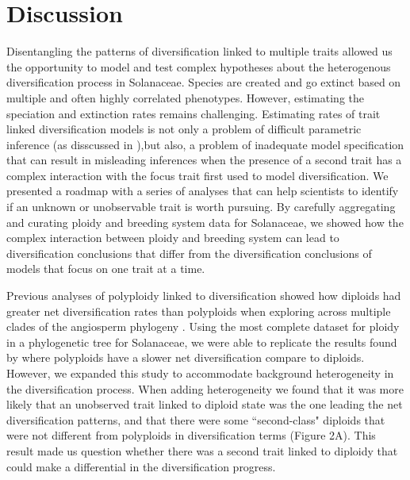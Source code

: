 \section{Discussion}

Disentangling the patterns of diversification linked to  multiple traits allowed us the opportunity to model and test complex hypotheses about the heterogenous diversification process in Solanaceae.
Species are created and go extinct based on multiple and often highly correlated phenotypes. However, estimating the speciation and extinction rates remains challenging. Estimating rates of trait linked diversification models is not only a problem of difficult parametric inference (as disscussed in  \citet{rabosky_2010, beaulieu_2015}),but also, a problem of inadequate model specification that can result in misleading inferences when the presence of a second trait has a complex interaction with the focus trait first used to model diversification. We presented a roadmap with a series of analyses that can help scientists to identify if an unknown or unobservable trait is worth pursuing. By carefully aggregating and curating ploidy and breeding system data for Solanaceae, we showed how  the complex interaction between ploidy and breeding system  can lead to diversification conclusions that differ from the diversification conclusions of models that focus on one trait at a time.

Previous analyses of polyploidy linked to diversification showed how diploids had greater net diversification rates than polyploids when exploring across multiple clades of the angiosperm phylogeny \citet{mayrose_2011, mayrose_2015}. 
Using the most complete dataset for ploidy in a phylogenetic tree for Solanaceae, we were able to replicate the results found by \citet{mayrose_2011} where polyploids have a slower net diversification compare to diploids.
However, we expanded this study to accommodate  background heterogeneity in the diversification process.
When adding heterogeneity we found that it was more likely that an unobserved trait linked to diploid state was the one leading the net diversification patterns, and that there were some ``second-class"  diploids that were not different from  polyploids  in diversification terms (Figure 2A).
This result made us question whether there was a second trait linked to diploidy that could make a differential in the diversification progress.

